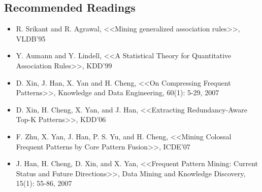 \subsection{Recommended Readings}
\begin{itemize}
\item R. Srikant and R. Agrawal, <<Mining generalized association rules>>, VLDB'95
\item Y. Aumann and Y. Lindell, <<A Statistical Theory for Quantitative Association Rules>>, KDD'99
\item D. Xin, J. Han, X. Yan and H. Cheng, <<On Compressing Frequent Patterns>>, Knowledge and Data Engineering, 60(1): 5-29, 2007
\item D. Xin, H. Cheng, X. Yan, and J. Han, <<Extracting Redundancy-Aware Top-K Patterns>>, KDD'06
\item F. Zhu, X. Yan, J. Han, P. S. Yu, and H. Cheng, <<Mining Colossal Frequent Patterns by Core Pattern Fusion>>, ICDE'07
\item J. Han, H. Cheng, D. Xin, and X. Yan, <<Frequent Pattern Mining: Current Status and Future Directions>>, Data Mining and Knowledge Discovery, 15(1): 55-86, 2007
\end{itemize}